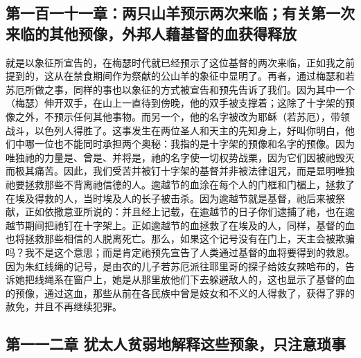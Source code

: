 
\subsection{第一百一十一章：两只山羊预示两次来临；有关第一次来临的其他预像，外邦人藉基督的血获得释放}

就是以象征所宣告的，在梅瑟时代就已经预示了这位基督的两次来临，正如我之前提到的，这从在禁食期间作为祭献的公山羊的象征中显明了。再者，通过梅瑟和若苏厄所做之事，同样的事也以象征的方式被宣告和预先告诉了我们。因为其中一个（梅瑟）伸开双手，在山上一直待到傍晚，他的双手被支撑着；这除了十字架的预像之外，不预示任何其他事物。而另一个，他的名字被改为耶稣（若苏厄），带领战斗，以色列人得胜了。这事发生在两位圣人和天主的先知身上，好叫你明白，他们中哪一位也不能同时承担两个奥秘：我指的是十字架的预像和名字的预像。因为唯独祂的力量是、曾是、并将是，祂的名字使一切权势战栗，因为它们因被祂毁灭而极其痛苦。因此，我们受苦并被钉十字架的基督并非被法律诅咒，而是显明唯独祂要拯救那些不背离祂信德的人。逾越节的血涂在每个人的门框和门楣上，拯救了在埃及得救的人，当时埃及人的长子被击杀。因为逾越节就是基督，祂后来被祭献，正如依撒意亚所说的：并且经上记载，在逾越节的日子你们逮捕了祂，也在逾越节期间把祂钉在十字架上。正如逾越节的血拯救了在埃及的人，同样，基督的血也将拯救那些相信的人脱离死亡。那么，如果这个记号没有在门上，天主会被欺骗吗？我不是这个意思；而是肯定祂预先宣告了人类通过基督的血将要得到的救恩。因为朱红线绳的记号，是由农的儿子若苏厄派往耶里哥的探子给妓女辣哈布的，告诉她把线绳系在窗户上，她是从那里放他们下去躲避敌人的，这也显示了基督的血的预像，通过这血，那些从前在各民族中曾是妓女和不义的人得救了，获得了罪的赦免，并且不再继续犯罪。\par


\subsection{第一一二章 犹太人贫弱地解释这些预象，只注意琐事}

